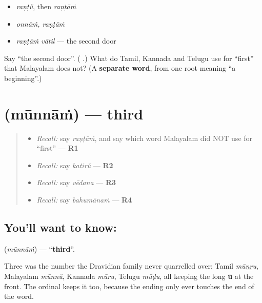\begin{itemize}
\raggedright
  \item \emph{raṇṭŭ}, then \emph{raṇṭāṁ}
  \item \emph{onnāṁ, raṇṭāṁ}
  \item \emph{raṇṭāṁ vātil} — the second door
\end{itemize}

\begin{tcolorbox}[breakable,colback=teal!4,colframe=teal!35!black,title={Before you move on}]
Say \textquotedblleft{}the second door\textquotedblright{}. (\textbf{ }.) What do Tamil, Kannada and Telugu use for \textquotedblleft{}first\textquotedblright{} that Malayalam does not? (A \textbf{separate word}, from one root meaning \textquotedblleft{}a beginning\textquotedblright{}.)
\end{tcolorbox}
\section[\texorpdfstring{\ml{മൂന്നാം} (mūnnāṁ)}{മൂന്നാം (mūnnāṁ)}]{ (mūnnāṁ) — third}

\label{lesson:ML-C67-third}



\begin{quote}
\begin{itemize}
\raggedright
  \item \emph{Recall:} say \emph{raṇṭāṁ}, and say which word Malayalam did NOT use for \textquotedblleft{}first\textquotedblright{} — \textbf{R1}
  \item \emph{Recall:} say \emph{katirŭ} — \textbf{R2}
  \item \emph{Recall:} say \emph{vēdana} — \textbf{R3}
  \item \emph{Recall:} say \emph{bahumānaṁ} — \textbf{R4}
\end{itemize}
\end{quote}

\subsection*{You'll want to know: }
\textbf{} (\emph{mūnnāṁ}) — \textquotedblleft{}\textbf{third}\textquotedblright{}.

Three was the number the Dravidian family never quarrelled over: Tamil \emph{mūṉṟu}, Malayalam \emph{mūnnŭ}, Kannada \emph{mūru}, Telugu \emph{mūḍu}, all keeping the long \textbf{ū} at the front. The ordinal keeps it too, because the ending only ever touches the end of the word.

